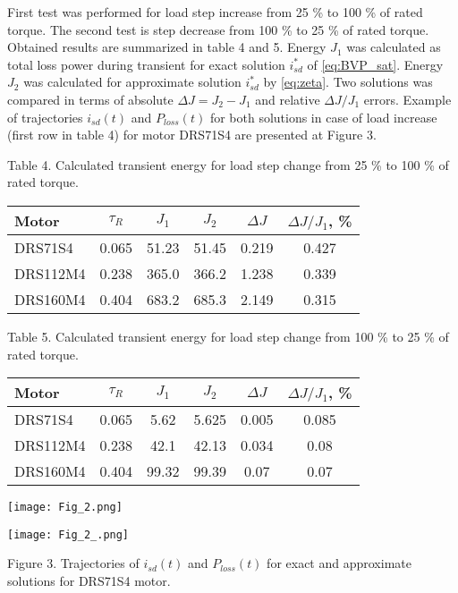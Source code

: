 \documentclass[journal]{IEEEtran}
\begin{document}
First test was performed for load step increase from 25 \% to 100 \% of rated torque. The second test is step decrease from 100 \% to 25 \% of rated torque. Obtained results are summarized in table 4 and 5. Energy $J_1$ was calculated as total loss power during transient for exact solution $i_{sd}^*$ of \eqref{eq:BVP_sat}. Energy $J_2$ was calculated for approximate solution $i_{sd}^*$ by \eqref{eq:zeta}. Two solutions was compared in terms of absolute $\Delta J = J_2 - J_1$ and relative $\Delta J/J_1$ errors. Example of trajectories $i_{sd}(t)$ and $P_{loss}(t)$ for both solutions in case of load increase (first row in table 4) for motor DRS71S4 are presented at Figure 3.

\begin{center}
Table 4.
Calculated transient energy for load step change from 25 \% to 100 \% of rated torque.

\begin{tabular}{ | l | c | c | c | c | c | }
\hline 
  Motor & $\tau_R$ & $J_1$ & $J_2$ & $\Delta J$ & $\Delta J/J_1$, \% \\
\hline 
DRS71S4 & 0.065 &  51.23 &  51.45  &  0.219  &  0.427 \\
DRS112M4 & 0.238 & 365.0 & 366.2  &  1.238  &  0.339 \\ 
DRS160M4 & 0.404 & 683.2 & 685.3  &  2.149  &  0.315 \\
\hline 
\end{tabular}

\end{center}

\begin{center}
Table 5.
Calculated transient energy for load step change from 100 \% to 25 \% of rated torque.

\begin{tabular}{ | l | c | c | c | c | c | }
\hline 
  Motor & $\tau_R$ & $J_1$ & $J_2$ & $\Delta J$ & $\Delta J/J_1$, \% \\
\hline 
DRS71S4 & 0.065  & 5.62   & 5.625   & 0.005   & 0.085 \\
DRS112M4 & 0.238  & 42.1  & 42.13  &  0.034  &  0.08 \\
DRS160M4 & 0.404  & 99.32  & 99.39  &  0.07  &  0.07 \\
\hline 
\end{tabular}

\end{center}

\begin{center}
\ifpdf \texttt{[image: Fig\_2.png]}
\fi

\ifpdf \texttt{[image: Fig\_2\_.png]}
\fi

Figure 3. Trajectories of $i_{sd}(t)$ and $P_{loss}(t)$ for exact and approximate solutions for DRS71S4 motor.
\end{center}
\end{document}
